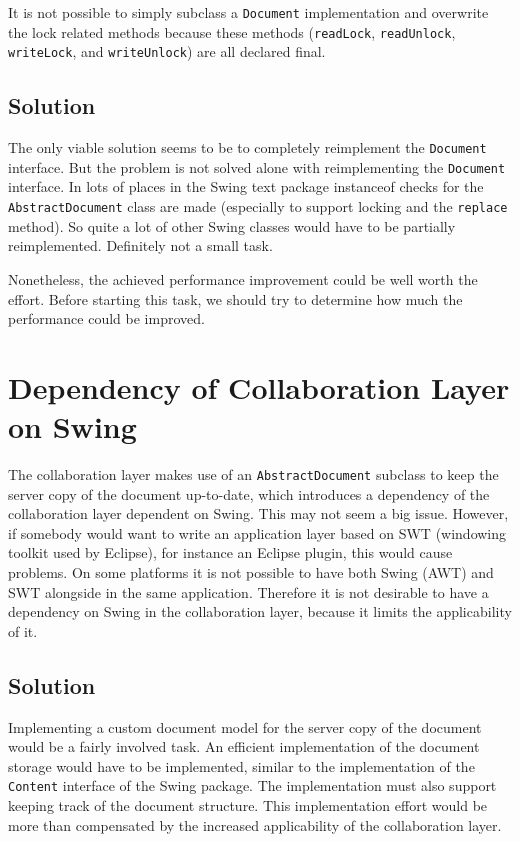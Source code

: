 It is not possible to simply subclass a \texttt{Document}
implementation and overwrite the lock related methods because these
methods (\texttt{read\-Lock}, \texttt{read\-Unlock}, \texttt{write\-Lock},
and \texttt{write\-Unlock}) are all declared final.


\subsection{Solution}
The only viable solution seems to be to completely reimplement the 
\texttt{Document} interface. But the problem is not solved alone with
reimplementing the \texttt{Document} interface. In lots of places in
the Swing text package instanceof checks for the
\texttt{Abstract\-Document} class are made (especially to support locking and
the \texttt{replace} method). So quite a lot of other Swing classes would
have to be partially reimplemented. Definitely not a small task.

Nonetheless, the achieved performance improvement could be well worth the 
effort. Before starting this task, we should try to determine how much
the performance could be improved.



\section{Dependency of Collaboration Layer on Swing}
The collaboration layer makes use of an \texttt{AbstractDocument} subclass to
keep the server copy of the document up-to-date, which introduces a
dependency of the collaboration
layer dependent on Swing. This may not seem a big issue. However, if 
somebody would want to write an application layer based on SWT (windowing
toolkit used by Eclipse), for instance an Eclipse plugin, this would
cause problems. On some platforms it is not possible to have both Swing (AWT)
and SWT alongside in the same application. Therefore it is not desirable
to have a dependency on Swing in the collaboration layer, because it limits
the applicability of it.


\subsection{Solution}
Implementing a custom document model for the server copy of the document
would be a fairly involved task. An efficient implementation of the
document storage would have to be implemented, similar to the implementation
of the \texttt{Content} interface of the Swing package. The implementation
must also support keeping track of the document structure. 
This implementation effort would be more than compensated by the 
increased applicability of the collaboration layer.



